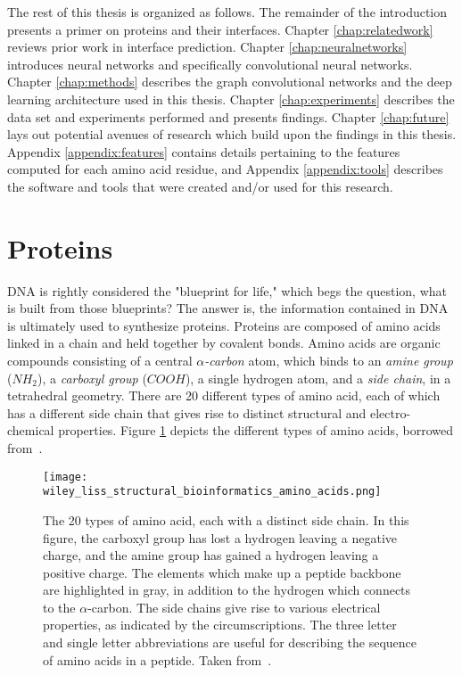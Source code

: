 The rest of this thesis is organized as follows.
The remainder of the introduction presents a primer on proteins and their interfaces. 
Chapter \ref{chap:relatedwork} reviews prior work in interface prediction.
Chapter \ref{chap:neuralnetworks} introduces neural networks and specifically convolutional neural networks.
Chapter \ref{chap:methods} describes the graph convolutional networks and the deep learning architecture used in this thesis.
Chapter \ref{chap:experiments} describes the data set and experiments performed and presents findings. 
Chapter \ref{chap:future} lays out potential avenues of research which build upon the findings in this thesis. 
Appendix \ref{appendix:features} contains details pertaining to the features computed for each amino acid residue, and Appendix \ref{appendix:tools} describes the software and tools that were created and/or used for this research.

\section{Proteins}

DNA is rightly considered the "blueprint for life," which begs the question, what is built from those blueprints?
The answer is, the information contained in DNA is ultimately used to synthesize proteins.
Proteins are composed of amino acids linked in a chain and held together by covalent bonds.
Amino acids are organic compounds consisting of a central \textit{$\alpha$-carbon} atom, which binds to an \textit{amine group} ($NH_2$), a \textit{carboxyl group} ($COOH$), a single hydrogen atom, and a \textit{side chain}, in a tetrahedral geometry.
There are 20 different types of amino acid, each of which has a different side chain that gives rise to distinct structural and electro-chemical properties.
Figure \ref{fig:aminoacids} depicts the different types of amino acids, borrowed from~\cite{scheeffink2003}.


\begin{figure}
	\centering
	\texttt{[image: wiley\_liss\_structural\_bioinformatics\_amino\_acids.png]}
	\caption{The 20 types of amino acid, each with a distinct side chain. In this figure, the carboxyl group has lost a hydrogen leaving a negative charge, and the amine group has gained a hydrogen leaving a positive charge. The elements which make up a peptide backbone are highlighted in gray, in addition to the hydrogen which connects to the $\alpha$-carbon. The side chains give rise to various electrical properties, as indicated by the circumscriptions. The three letter and single letter abbreviations are useful for describing the sequence of amino acids in a peptide. Taken from~\cite{scheeffink2003}.}
	\label{fig:aminoacids}
\end{figure}

